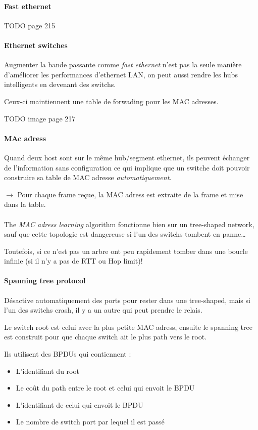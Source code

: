\paragraph{Fast ethernet}
TODO page 215

\paragraph{Ethernet switches}
Augmenter la bande passante comme \textit{fast ethernet} n'est pas la seule
manière d'améliorer les performances d'ethernet LAN, on peut aussi rendre
les hubs intelligents en devenant des switchs.

Ceux-ci maintiennent une table de forwading pour les MAC adresses.

TODO image page 217


\paragraph{MAc adress}
Quand deux host sont sur le même hub/segment ethernet, ils peuvent échanger de
l'information sans configuration ce qui implique que un switche doit pouvoir
construire sa table de MAC adresse \textit{automatiquement}.

$\rightarrow$ Pour chaque frame reçue, la MAC adress est extraite de la frame et mise dans la table.

\paragraph{ }
The \textit{MAC adress learning} algorithm fonctionne bien sur un tree-shaped network,
sauf que cette topologie est dangereuse si l'un des switchs tombent en panne\ldots

Toutefois, si ce n'est pas un arbre ont peu rapidement tomber dans une boucle infinie
(si il n'y a pas de RTT ou Hop limit)!

\paragraph{Spanning tree protocol}
Désactive automatiquement des ports pour rester dans une tree-shaped, mais si l'un
des switchs crash, il y a un autre qui peut prendre le relais.

Le switch root est celui avec la plus petite MAC adress, ensuite le spanning tree est construit
pour que chaque switch ait le plus path vers le root.

Ils utilisent des BPDUs qui contiennent :
\begin{itemize}
    \item L'identifiant du root
    \item Le coût du path entre le root et celui qui envoit le BPDU
    \item L'identifiant de celui qui envoit le BPDU
    \item Le nombre de switch port par lequel il est passé
\end{itemize}


